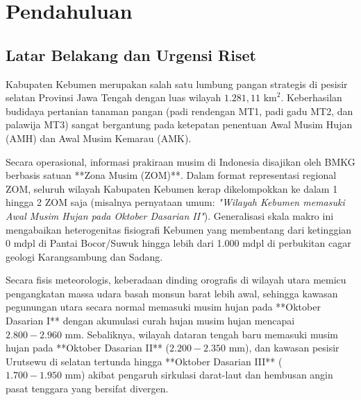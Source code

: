 \documentclass[11pt,a4paper]{article}
\begin{document}
\newpage
\tableofcontents
\newpage
\listoffigures
\newpage
\listoftables
\newpage

\setcounter{page}{1}

\section{Pendahuluan}

\subsection{Latar Belakang dan Urgensi Riset}
Kabupaten Kebumen merupakan salah satu lumbung pangan strategis di pesisir selatan Provinsi Jawa Tengah dengan luas wilayah $1.281,11\text{ km}^2$. Keberhasilan budidaya pertanian tanaman pangan (padi rendengan MT1, padi gadu MT2, dan palawija MT3) sangat bergantung pada ketepatan penentuan Awal Musim Hujan (AMH) dan Awal Musim Kemarau (AMK). 

Secara operasional, informasi prakiraan musim di Indonesia disajikan oleh BMKG berbasis satuan **Zona Musim (ZOM)**. Dalam format representasi regional ZOM, seluruh wilayah Kabupaten Kebumen kerap dikelompokkan ke dalam 1 hingga 2 ZOM saja (misalnya pernyataan umum: \textit{"Wilayah Kebumen memasuki Awal Musim Hujan pada Oktober Dasarian II"}). Generalisasi skala makro ini mengabaikan heterogenitas fisiografi Kebumen yang membentang dari ketinggian 0 mdpl di Pantai Bocor/Suwuk hingga lebih dari 1.000 mdpl di perbukitan cagar geologi Karangsambung dan Sadang.

Secara fisis meteorologis, keberadaan dinding orografis di wilayah utara memicu pengangkatan massa udara basah monsun barat lebih awal, sehingga kawasan pegunungan utara secara normal memasuki musim hujan pada **Oktober Dasarian I** dengan akumulasi curah hujan musim hujan mencapai $2.800 - 2.960\text{ mm}$. Sebaliknya, wilayah dataran tengah baru memasuki musim hujan pada **Oktober Dasarian II** ($2.200 - 2.350\text{ mm}$), dan kawasan pesisir Urutsewu di selatan tertunda hingga **Oktober Dasarian III** ($1.700 - 1.950\text{ mm}$) akibat pengaruh sirkulasi darat-laut dan hembusan angin pasat tenggara yang bersifat divergen.
\end{document}
